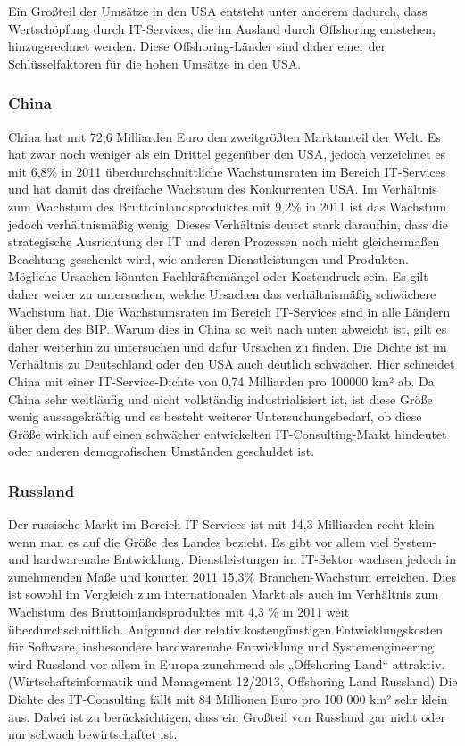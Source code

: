 Ein Großteil der Umsätze in den USA entsteht unter anderem dadurch, dass Wertschöpfung durch IT-Services, die im Ausland durch Offshoring entstehen, hinzugerechnet werden. Diese Offshoring-Länder sind daher einer der Schlüsselfaktoren für die hohen Umsätze in den USA. 

\subsubsection* {China}

China hat mit 72,6 Milliarden Euro den zweitgrößten Marktanteil der Welt. Es hat zwar noch weniger als ein Drittel gegenüber den USA, jedoch verzeichnet es mit 6,8\% in 2011 überdurchschnittliche Wachstumsraten im Bereich IT-Services und hat damit das dreifache Wachstum des Konkurrenten USA.  Im Verhältnis zum Wachstum des Bruttoinlandsproduktes mit 9,2\% in 2011 ist das Wachstum jedoch verhältnismäßig wenig. Dieses Verhältnis deutet stark daraufhin, dass die strategische Ausrichtung der IT und deren Prozessen noch nicht gleichermaßen Beachtung geschenkt wird, wie anderen Dienstleistungen und Produkten. Mögliche Ursachen könnten Fachkräftemängel oder Kostendruck sein. Es gilt daher weiter zu untersuchen, welche Ursachen das verhältnismäßig schwächere Wachstum hat. 
Die Wachstumsraten im Bereich IT-Services sind in alle Ländern über dem des BIP. Warum dies in China so weit nach unten abweicht ist, gilt es daher weiterhin zu untersuchen und dafür Ursachen zu finden.
Die Dichte ist im Verhältnis zu Deutschland oder den USA auch deutlich schwächer. Hier schneidet China mit einer IT-Service-Dichte von 0,74 Milliarden pro 100000 km² ab. Da China sehr weitläufig und nicht vollständig industrialisiert ist, ist diese Größe wenig aussagekräftig und es besteht weiterer Untersuchungsbedarf, ob diese Größe wirklich auf einen schwächer entwickelten IT-Consulting-Markt hindeutet oder anderen demografischen Umständen geschuldet ist. \cite{ibisChina}

\subsubsection* {Russland}

Der russische Markt im Bereich IT-Services ist mit 14,3 Milliarden recht klein wenn man es auf die Größe des Landes bezieht. Es gibt vor allem viel System- und hardwarenahe Entwicklung. Dienstleistungen im IT-Sektor wachsen jedoch in zunehmenden Maße und konnten 2011 15,3\% Branchen-Wachstum erreichen. Dies ist sowohl im Vergleich zum internationalen Markt als auch im Verhältnis zum Wachstum des Bruttoinlandsproduktes mit 4,3 \% in 2011 weit überdurchschnittlich. \cite{statRus2} Aufgrund der relativ kostengünstigen Entwicklungskosten für Software, insbesondere hardwarenahe Entwicklung und Systemengineering wird Russland vor allem in Europa zunehmend als „Offshoring Land“ attraktiv. (Wirtschaftsinformatik und Management 12/2013, Offshoring Land Russland)
Die Dichte des IT-Consulting fällt mit 84 Millionen Euro pro 100 000 km² sehr klein aus. Dabei ist zu berücksichtigen, dass ein Großteil von Russland gar nicht oder nur schwach bewirtschaftet ist. \cite{statRus}


